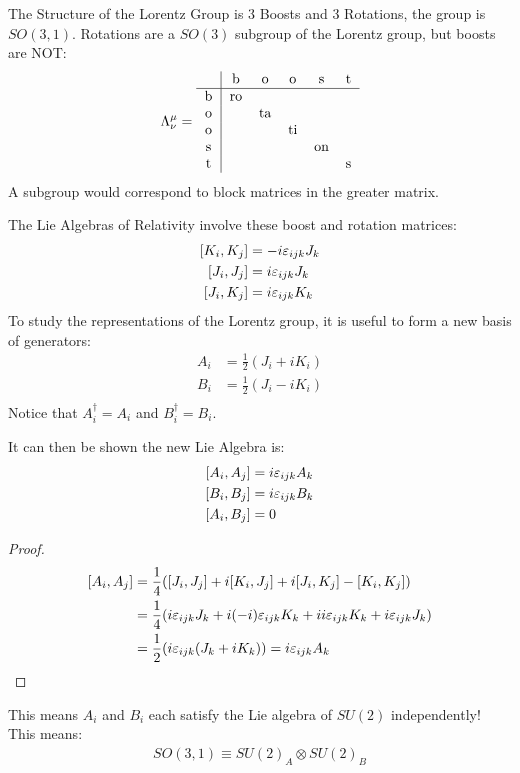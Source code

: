 \begin{aside}
  The Structure of the Lorentz Group is 3 Boosts and 3 Rotations, the group is $SO(3,1)$. Rotations are a $SO(3)$ subgroup of the Lorentz group, but boosts are NOT:\@
  \begin{align*}
    \Lambda^\mu_\nu=
    \begin{tabular}{c|ccccc}
        & b  & o  & o  & s  & t \\ \hline
      b & ro &    &    &    &   \\
      o &    & ta &    &    &   \\
      o &    &    & ti &    &   \\
      s &    &    &    & on &   \\
      t &    &    &    &    & s
    \end{tabular}
  \end{align*}
  A subgroup would correspond to block matrices in the greater matrix.
\end{aside}
The Lie Algebras of Relativity involve these boost and rotation matrices:
\begin{align*}
  \comm{K_i}{K_j}&=-i\veps_{ijk}J_k\\
  \comm{J_i}{J_j}&= i\veps_{ijk}J_k\\
  \comm{J_i}{K_j}&= i\veps_{ijk}K_k
\end{align*}
To study the representations of the Lorentz group, it is useful to form a new basis of generators:
\begin{align*}
  A_i&=\frac12(J_i+iK_i)\\
  B_i&=\frac12(J_i-iK_i)\\
\end{align*}
Notice that $A_i^\dag=A_i$ and $B_i^\dag=B_i$.

It can then be shown the new Lie Algebra is:
\begin{align*}
  \comm{A_i}{A_j}&=i\veps_{ijk}A_k\\
  \comm{B_i}{B_j}&=i\veps_{ijk}B_k\\
  \comm{A_i}{B_j}&=0
\end{align*}
\begin{proof}
  \begin{align*}
    \comm{A_i}{A_j}&=\frac14\qty(
    \comm{J_i}{J_j}+i\comm{K_i}{J_j}+i\comm{J_i}{K_j}-\comm{K_i}{K_j})\\
    &=\frac14\qty(
    i\veps_{ijk}J_k+i(-i)\veps_{ijk}K_k+ii\veps_{ijk}K_k+i\veps_{ijk}J_k)\\
    &=\frac12\qty(i\veps_{ijk}(J_k+iK_k))=i\veps_{ijk}A_k
  \end{align*}
\end{proof}
This means $A_i$ and $B_i$ each satisfy the Lie algebra of $SU(2)$ independently! This means:
\begin{align*}
  SO(3,1)\equiv SU{(2)}_A\otimes SU{(2)}_B
\end{align*}

